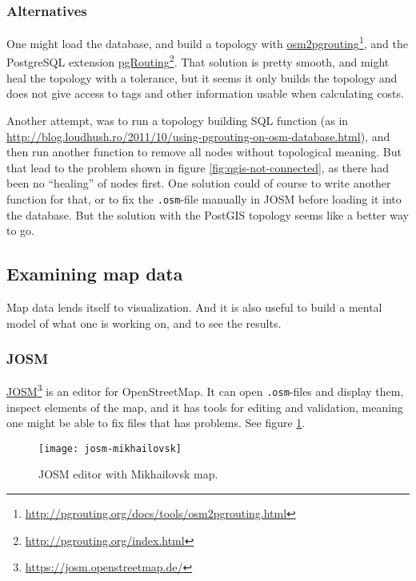 \documentclass[../main.tex]{subfiles}
\begin{document}
\subsubsection{Alternatives}
One might load the database, and build a topology with \href{http://pgrouting.org/docs/tools/osm2pgrouting.html}{osm2pgrouting}\footnote{\url{http://pgrouting.org/docs/tools/osm2pgrouting.html}}, and the PostgreSQL extension \href{http://pgrouting.org/index.html}{pgRouting}\footnote{\url{http://pgrouting.org/index.html}}. That solution is pretty smooth, and might heal the topology with a tolerance, but it seems it only builds the topology and does not give access to tags and other information usable when calculating costs.

Another attempt, was to run a topology building SQL function (as in \url{http://blog.loudhush.ro/2011/10/using-pgrouting-on-osm-database.html}), and then run another function to remove all nodes without topological meaning. But that lead to the problem shown in figure \ref{fig:qgis-not-connected}, as there had been no ``healing'' of nodes first. One solution could of course to write another function for that, or to fix the \texttt{.osm}-file manually in JOSM before loading it into the database. But the solution with the PostGIS topology seems like a better way to go.

\subsection{Examining map data}
Map data lends itself to visualization. And it is also useful to build a mental model of what one is working on, and to see the results.

\subsubsection{JOSM}
\href{https://josm.openstreetmap.de/}{JOSM}\footnote{\url{https://josm.openstreetmap.de/}} is an editor for OpenStreetMap. It can open \texttt{.osm}-files and display them, inspect elements of the map, and it has tools for editing and validation, meaning one might be able to fix files that has problems. See figure \ref{fig:josm-mikhailovsk}.

\begin{figure}[h]
    \centering
    \texttt{[image: josm-mikhailovsk]}
    \caption{JOSM editor with Mikhailovsk map.}
    \label{fig:josm-mikhailovsk}
\end{figure}
\end{document}
